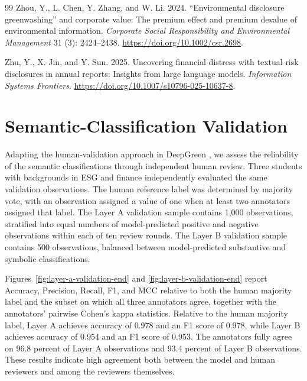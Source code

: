 \documentclass[11pt]{article}
\begin{document}
\begin{thebibliography}{99}
Zhou, Y., L. Chen, Y. Zhang, and W. Li. 2024.
``Environmental disclosure greenwashing'' and corporate value: The premium effect and premium devalue of environmental information.
\textit{Corporate Social Responsibility and Environmental Management} 31 (3): 2424--2438. \url{https://doi.org/10.1002/csr.2698}.

Zhu, Y., X. Jin, and Y. Sun. 2025.
Uncovering financial distress with textual risk disclosures in annual reports: Insights from large language models.
\textit{Information Systems Frontiers}. \url{https://doi.org/10.1007/s10796-025-10637-8}.

\end{thebibliography}

\appendix
\section{Semantic-Classification Validation}
\label{sec:semantic-validation}

Adapting the human-validation approach in DeepGreen \citep{xu2026deepgreen}, we assess the reliability of the semantic classifications through independent human review. Three students with backgrounds in ESG and finance independently evaluated the same validation observations. The human reference label was determined by majority vote, with an observation assigned a value of one when at least two annotators assigned that label. The Layer A validation sample contains 1,000 observations, stratified into equal numbers of model-predicted positive and negative observations within each of ten review rounds. The Layer B validation sample contains 500 observations, balanced between model-predicted substantive and symbolic classifications.

Figures~\ref{fig:layer-a-validation-end} and \ref{fig:layer-b-validation-end} report Accuracy, Precision, Recall, F1, and MCC relative to both the human majority label and the subset on which all three annotators agree, together with the annotators' pairwise Cohen's kappa statistics. Relative to the human majority label, Layer A achieves accuracy of 0.978 and an F1 score of 0.978, while Layer B achieves accuracy of 0.954 and an F1 score of 0.953. The annotators fully agree on 96.8 percent of Layer A observations and 93.4 percent of Layer B observations. These results indicate high agreement both between the model and human reviewers and among the reviewers themselves.
\end{document}
